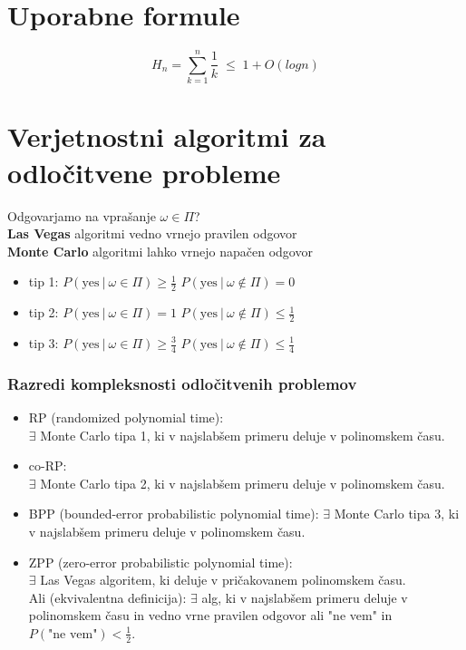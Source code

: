 
 

\begin{multicols}{4}
\setlength{\premulticols}{1pt}
\setlength{\postmulticols}{1pt}
\setlength{\multicolsep}{1pt}
\setlength{\columnsep}{2pt}

\section{Uporabne formule}

\[ H_n = \sum_{k=1}^n \frac{1}{k}\; \leq \; 1 + O(log n)\]

\section{Verjetnostni algoritmi za odločitvene probleme}
Odgovarjamo na vprašanje $\omega \in \Pi$? \\
\textbf{Las Vegas} algoritmi vedno vrnejo pravilen odgovor \\
\textbf{Monte Carlo} algoritmi lahko vrnejo napačen odgovor
\begin{itemize}
	\item tip 1: $P(\text{yes}\ |\ \omega \in \Pi) \geq \frac{1}{2}$ $P(\text{yes}\ |\ \omega \notin \Pi) = 0$ 
	\item tip 2: $P(\text{yes}\ |\ \omega \in \Pi) = 1$ $P(\text{yes}\ |\ \omega \notin \Pi) \leq \frac{1}{2}$
	\item tip 3: $P(\text{yes}\ |\ \omega \in \Pi) \geq \frac{3}{4}$ $P(\text{yes}\ |\ \omega \notin \Pi) \leq \frac{1}{4}$
\end{itemize}

\subsubsection*{Razredi kompleksnosti odločitvenih problemov}
\begin{itemize}
	\item RP (randomized polynomial time): \\
	$\exists$ Monte Carlo tipa 1, ki v najslabšem primeru deluje v polinomskem času.
	\item co-RP: \\ 
	$\exists$ Monte Carlo tipa 2, ki v najslabšem primeru deluje v polinomskem času.
	\item BPP (bounded-error probabilistic polynomial time): $\exists$ Monte Carlo tipa 3, ki v najslabšem primeru deluje v polinomskem času.
	\item ZPP (zero-error probabilistic polynomial time): \\ 
	$\exists$ Las Vegas algoritem, ki deluje v pričakovanem polinomskem času. \\
	Ali (ekvivalentna definicija): $\exists$ alg, ki v najslabšem primeru deluje v polinomskem času in vedno vrne pravilen odgovor ali "ne vem" in $P(\text{"ne vem"}) < \frac{1}{2}$.
\end{itemize}


\end{multicols}
